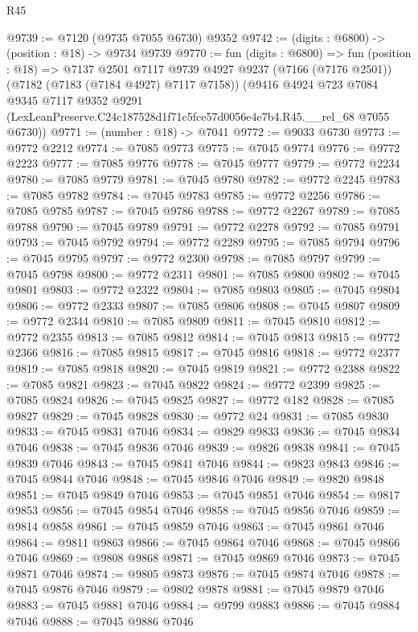 \begin{lexlean}{R45}
\begin{coremodule}
{@9739 := @7120 (@9735 @7055 @6730) @9352
@9742 := (digits : @6800) -> (position : @18) -> @9734 @9739
@9770 := fun (digits : @6800) =>
  fun (position : @18) =>
  @7137
    @2501
    @7117
    @9739
    @4927
    @9237
    (@7166 (@7176 @2501))
    (@7182 (@7183 (@7184 @4927) @7117 @7158))
    (@9416
      @4924
      @723
      @7084
      @9345
      @7117
      @9352
      @9291
      (LexLeanPreserve.C24c187528d1f71c5fce57d0056e4e7b4.R45.__rel_68 @7055 @6730))
@9771 := (number : @18) -> @7041
@9772 := @9033 @6730
@9773 := @9772 @2212
@9774 := @7085 @9773
@9775 := @7045 @9774
@9776 := @9772 @2223
@9777 := @7085 @9776
@9778 := @7045 @9777
@9779 := @9772 @2234
@9780 := @7085 @9779
@9781 := @7045 @9780
@9782 := @9772 @2245
@9783 := @7085 @9782
@9784 := @7045 @9783
@9785 := @9772 @2256
@9786 := @7085 @9785
@9787 := @7045 @9786
@9788 := @9772 @2267
@9789 := @7085 @9788
@9790 := @7045 @9789
@9791 := @9772 @2278
@9792 := @7085 @9791
@9793 := @7045 @9792
@9794 := @9772 @2289
@9795 := @7085 @9794
@9796 := @7045 @9795
@9797 := @9772 @2300
@9798 := @7085 @9797
@9799 := @7045 @9798
@9800 := @9772 @2311
@9801 := @7085 @9800
@9802 := @7045 @9801
@9803 := @9772 @2322
@9804 := @7085 @9803
@9805 := @7045 @9804
@9806 := @9772 @2333
@9807 := @7085 @9806
@9808 := @7045 @9807
@9809 := @9772 @2344
@9810 := @7085 @9809
@9811 := @7045 @9810
@9812 := @9772 @2355
@9813 := @7085 @9812
@9814 := @7045 @9813
@9815 := @9772 @2366
@9816 := @7085 @9815
@9817 := @7045 @9816
@9818 := @9772 @2377
@9819 := @7085 @9818
@9820 := @7045 @9819
@9821 := @9772 @2388
@9822 := @7085 @9821
@9823 := @7045 @9822
@9824 := @9772 @2399
@9825 := @7085 @9824
@9826 := @7045 @9825
@9827 := @9772 @182
@9828 := @7085 @9827
@9829 := @7045 @9828
@9830 := @9772 @24
@9831 := @7085 @9830
@9833 := @7045 @9831 @7046
@9834 := @9829 @9833
@9836 := @7045 @9834 @7046
@9838 := @7045 @9836 @7046
@9839 := @9826 @9838
@9841 := @7045 @9839 @7046
@9843 := @7045 @9841 @7046
@9844 := @9823 @9843
@9846 := @7045 @9844 @7046
@9848 := @7045 @9846 @7046
@9849 := @9820 @9848
@9851 := @7045 @9849 @7046
@9853 := @7045 @9851 @7046
@9854 := @9817 @9853
@9856 := @7045 @9854 @7046
@9858 := @7045 @9856 @7046
@9859 := @9814 @9858
@9861 := @7045 @9859 @7046
@9863 := @7045 @9861 @7046
@9864 := @9811 @9863
@9866 := @7045 @9864 @7046
@9868 := @7045 @9866 @7046
@9869 := @9808 @9868
@9871 := @7045 @9869 @7046
@9873 := @7045 @9871 @7046
@9874 := @9805 @9873
@9876 := @7045 @9874 @7046
@9878 := @7045 @9876 @7046
@9879 := @9802 @9878
@9881 := @7045 @9879 @7046
@9883 := @7045 @9881 @7046
@9884 := @9799 @9883
@9886 := @7045 @9884 @7046
@9888 := @7045 @9886 @7046
}
\end{coremodule}
\end{lexlean}
